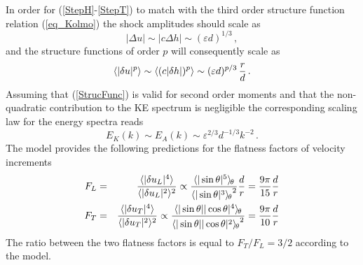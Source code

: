 In order for (\ref{StepH}-\ref{StepT}) to match with the third order structure function relation (\ref{eq_Kolmo})  the shock amplitudes should scale as
\begin{equation} \label{Strength}
 | \Delta u | \sim | c \Delta h | \sim (\varepsilon d)^{1/3} \, ,
\end{equation}
and the structure functions of order $ p $ will consequently scale as
\begin{equation} \label{StrucFunc}
\langle |\delta u |^p \rangle  \sim \langle (c|\delta h |)^p \rangle \sim  (\varepsilon  d)^{p/3} \,  \frac{r}{d} \, .
\end{equation}
Assuming that (\ref{StrucFunc}) is valid for second order moments and that the
non-quadratic contribution to the KE spectrum is negligible the corresponding
scaling law for the energy spectra reads
\begin{equation} \label{Spectra}
E_K(k)  \sim  E_A(k) \sim \varepsilon ^{2/3} d^{-1/3} k^{-2} \, .
\end{equation}
The  model  provides the following predictions for the flatness factors of velocity increments
\begin{eqnarray} \label{FL}
F_L &=&  \frac{\langle |\delta u_L|^4 \rangle}{\langle |\delta u_L|^2 \rangle^2}
\propto
\frac{{\langle |\sin\theta|^5 \rangle_{\hspace{-0.4mm}\theta}}}{{\langle |\sin\theta|^3 \rangle_{\hspace{-0.4mm}\theta}}^2} \frac{d}{r}   = \frac{9\pi}{15}  \frac{d}{r} \\ \label{FT}
F_T &=&  \frac{\langle |\delta u_T|^4 \rangle}{\langle |\delta u_T|^2 \rangle^2}
\propto
\frac{{\langle |\sin\theta||\cos\theta|^4 \rangle_{\hspace{-0.4mm}\theta}}}{{\langle |\sin\theta||\cos\theta|^2 \rangle_{\hspace{-0.4mm}\theta}}^2} =  \frac{9\pi}{10}  \frac{d}{r}
\end{eqnarray}
The ratio between the two flatness factors is equal  to
$F_T/F_L = 3/2$ according to the model.

